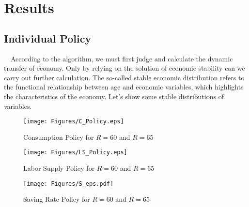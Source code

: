 \documentclass{article}
\begin{document}
\section{Results}
    \subsection{Individual Policy}
        ~\
        According to the algorithm, we must first judge and calculate the dynamic transfer of economy. Only by relying on the solution of economic stability can we carry out further calculation. The so-called stable economic distribution refers to the functional relationship between age and economic variables, which highlights the characteristics of the economy. Let's show some stable distributions of variables.

        \begin{figure}[H]
            \centering
            \texttt{[image: Figures/C\_Policy.eps]}
            \caption{Consumption Policy for $R=60$ and $R=65$}
        \end{figure}
        \begin{figure}[H]
            \centering
            \texttt{[image: Figures/LS\_Policy.eps]}
            \caption{Labor Supply Policy for $R=60$ and $R=65$}
        \end{figure}
        \begin{figure}[H] 
            \centering
            \texttt{[image: Figures/S\_eps.pdf]}
            \caption{Saving Rate Policy for $R=60$ and $R=65$}
        \end{figure}
\end{document}
